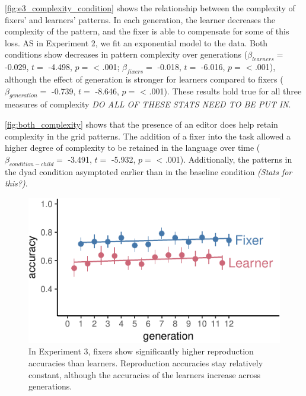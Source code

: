 \documentclass[10pt, letterpaper]{article}
\newenvironment{CodeChunk}{}{}
\begin{document}
\ref{fig:e3_complexity_condition} shows the relationship between the
complexity of fixers' and learners' patterns. In each generation, the
learner decreases the complexity of the pattern, and the fixer is able
to compensate for some of this loss. AS in Experiment 2, we fit an
exponential model to the data. Both conditions show decreases in pattern
complexity over generations (\(\beta_{learners} =\) -0.029, \(t =\)
-4.498, \(p =\) \textless{} .001; \(\beta_{fixers} =\) -0.018, \(t =\)
-6.016, \(p =\) \textless{} .001), although the effect of generation is
stronger for learners compared to fixers (\(\beta_{generation} =\)
-0.739, \(t =\) -8.646, \(p =\) \textless{} .001). These results hold
true for all three measures of complexity \emph{DO ALL OF THESE STATS
NEED TO BE PUT IN}.

\ref{fig:both_complexity} shows that the presence of an editor does help
retain complexity in the grid patterns. The addition of a fixer into the
task allowed a higher degree of complexity to be retained in the
language over time (\(\beta_{condition-child} =\) -3.491, \(t =\)
-5.932, \(p =\) \textless{} .001). Additionally, the patterns in the
dyad condition asymptoted earlier than in the baseline condition
\emph{(Stats for this?)}.

\begin{CodeChunk}
\begin{figure}[tb]

{\centering \includegraphics{figs/dyad_accuracy-1} 

}

\caption[In Experiment 3, fixers show significantly higher reproduction accuracies than learners]{In Experiment 3, fixers show significantly higher reproduction accuracies than learners. Reproduction accuracies stay relatively constant, although the accuracies of the learners increase across generations.}\label{fig:dyad_accuracy}
\end{figure}
\end{CodeChunk}
\end{document}
